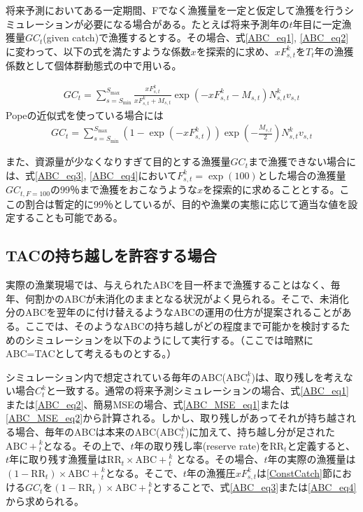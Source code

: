 \documentclass[11pt]{jsarticle}
\begin{document}
将来予測においてある一定期間、Fでなく漁獲量を一定と仮定して漁獲を行うシミュレーションが必要になる場合がある。たとえば将来予測年の$t$年目に一定漁獲量$GC_{t}$(given catch)で漁獲するとする。その場合、式\ref{ABC_eq1}, \ref{ABC_eq2}に変わって、以下の式を満たすような係数$x$を探索的に求め、$xF_{s,t}^k$を$T_t$年の漁獲係数として個体群動態式の中で用いる。

\begin{eqnarray}
  GC_{t}=\sum_{s=S_{\mathrm{min}}}^{S_{\mathrm{max}}} \frac{xF_{s,t}^k}{xF_{s,t}^k+M_{s,t}}
  \exp(- xF_{s,t}^k-M_{s,t}) N_{s,t}^k v_{s,t}
\label{ABC_eq3}
\end{eqnarray}
Popeの近似式を使っている場合には
\begin{eqnarray}
  GC_{t}=\sum_{s=S_{\mathrm{min}}}^{S_{\mathrm{max}}} (1-\exp(- xF_{s,t}^k)) \exp(-\frac{M_{s,t}}{2}) N_{s,t}^k v_{s,t}
\label{ABC_eq4}
\end{eqnarray}

また、資源量が少なくなりすぎて目的とする漁獲量$GC_{t}$まで漁獲できない場合には、式\ref{ABC_eq3}, \ref{ABC_eq4}において$F_{s,t}^k=\exp(100)$とした場合の漁獲量$GC_{t,F=100}$の99％まで漁獲をおこなうような$x$を探索的に求めることとする。ここの割合は暫定的に99％としているが、目的や漁業の実態に応じて適当な値を設定することも可能である。

\subsection{TACの持ち越しを許容する場合}
実際の漁業現場では、与えられたABCを目一杯まで漁獲することはなく、毎年、何割かのABCが未消化のままとなる状況がよく見られる。そこで、未消化分のABCを翌年のに付け替えるようなABCの運用の仕方が提案されることがある。ここでは、そのようなABCの持ち越しがどの程度まで可能かを検討するためのシミュレーションを以下のようにして実行する。（ここでは暗黙にABC=TACとして考えるものとする。）

シミュレーション内で想定されている毎年のABC($\mathrm{ABC}_t^k$)は、取り残しを考えない場合$C_t^k$と一致する。通常の将来予測シミュレーションの場合、式\ref{ABC_eq1}または\ref{ABC_eq2}、簡易MSEの場合、式\ref{ABC_MSE_eq1}または\ref{ABC_MSE_eq2}から計算される。しかし、取り残しがあってそれが持ち越される場合、毎年のABCは本来のABC($\mathrm{ABC}_t^k$)に加えて、持ち越し分が足された$\mathrm{ABC+}_t^k$となる。その上で、$t$年の取り残し率(reserve rate)を$\mathrm{RR}_t$と定義すると、$t$年に取り残す漁獲量は$\mathrm{RR}_t \times \mathrm{ABC+}_{t}^{k}$ となる。その場合、$t$年の実際の漁獲量は$(1-\mathrm{RR}_t) \times \mathrm{ABC+}_{t}^{k}$となる。そこで、$t$年の漁獲圧$xF_{s,t}^k$は\ref{ConstCatch}節における$GC_{t}$を$(1-\mathrm{RR}_t) \times \mathrm{ABC+}_{t}^{k}$とすることで、式\ref{ABC_eq3}または\ref{ABC_eq4}から求められる。
\end{document}
